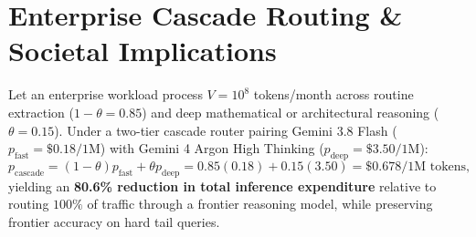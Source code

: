 \documentclass[11pt]{article}
\begin{document}
\section{Enterprise Cascade Routing \& Societal Implications}
Let an enterprise workload process $V = 10^8$ tokens/month across routine extraction ($1 - \theta = 0.85$) and deep mathematical or architectural reasoning ($\theta = 0.15$). Under a two-tier cascade router pairing Gemini 3.8 Flash ($p_{\text{fast}} = \$0.18/\text{1M}$) with Gemini 4 Argon High Thinking ($p_{\text{deep}} = \$3.50/\text{1M}$):
\begin{equation}
  p_{\text{cascade}} = (1 - \theta) p_{\text{fast}} + \theta p_{\text{deep}} = 0.85(0.18) + 0.15(3.50) = \$0.678/\text{1M tokens},
  \label{eq:cascade}
\end{equation}
yielding an \textbf{80.6\% reduction in total inference expenditure} relative to routing $100\%$ of traffic through a frontier reasoning model, while preserving frontier accuracy on hard tail queries.
\end{document}
